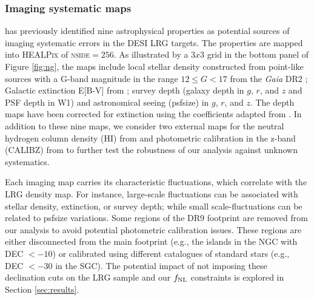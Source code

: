 \subsubsection{Imaging systematic maps}
\cite{zhou2022target} has previously identified nine astrophysical properties as potential sources of imaging systematic errors in the DESI LRG targets. The properties are mapped into \textsc{HEALPix} of \textsc{nside}$=256$. As illustrated by a $3x3$ grid in the bottom panel of Figure \ref{fig:ng}, the maps include local stellar density constructed from point-like sources with a G-band magnitude in the range $12 \leq G < 17$ from the \textit{Gaia} DR2 \citep[see,][]{gaiadr2, myers2022}; Galactic extinction E[B-V] from \cite{schlegel1998maps}; survey depth (galaxy depth in $g$, $r$, and $z$ and PSF depth in W1) and astronomical seeing (psfsize) in $g$, $r$, and $z$. The depth maps have been corrected for extinction using the coefficients adapted from \cite{2011ApJ...737..103S}. In addition to these nine maps, we consider two external maps for the neutral hydrogen column density (HI) from \cite{2016A&A...594A.116H} and photometric calibration in the z-band (CALIBZ) from  to further test the robustness of our analysis against unknown systematics.

Each imaging map carries its characteristic fluctuations, which correlate with the LRG density map. For instance, large-scale fluctuations can be associated with stellar density, extinction, or survey depth; while small scale-fluctuations can be related to psfsize variations. Some regions of the DR9 footprint are removed from our analysis to avoid potential photometric calibration issues. These regions are either disconnected from the main footprint (e.g., the islands in the NGC with DEC $<-10$) or calibrated using different catalogues of standard stars (e.g., DEC $<-30$ in the SGC). The potential impact of not imposing these declination cuts on the LRG sample and our $f_{\rm NL}$ constraints is explored in Section \ref{sec:results}. 

